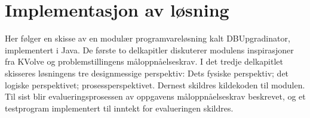 
\chapter{Implementasjon av løsning}

Her følger en skisse av en modulær programvareløsning kalt DBUpgradinator, implementert i Java. De første to delkapitler diskuterer modulens inspirasjoner fra KVolve og problemstillingens måloppnåelseskrav. I det tredje delkapitlet skisseres løsningens tre designmessige perspektiv: Dets fysiske perspektiv; det logiske perspektivet; prosessperspektivet. Dernest skildres kildekoden til modulen. Til sist blir evalueringsprosessen av oppgavens måloppnåelseskrav beskrevet, og et testprogram implementert til inntekt for evalueringen skildres.





\cleardoublepage
